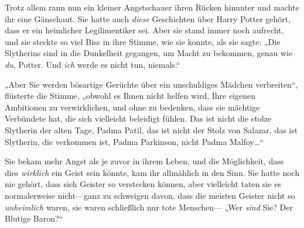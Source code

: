 Trotz allem rann nun ein kleiner Angstschauer ihren Rücken hinunter und machte ihr eine Gänsehaut. Sie hatte auch \emph{diese} Geschichten über Harry Potter gehört, dass er ein heimlicher Legilimentiker sei. Aber sie stand immer noch aufrecht, und sie steckte so viel Biss in ihre Stimme, wie sie konnte, als sie sagte: „Die Slytherins sind in die Dunkelheit gegangen, um Macht zu bekommen, genau wie \emph{du}, Potter. Und \emph{ich} werde es nicht tun, niemals.“

„Aber Sie werden bösartige Gerüchte über ein unschuldiges Mädchen verbreiten“, flüsterte die Stimme, „obwohl es Ihnen nicht helfen wird, Ihre eigenen Ambitionen zu verwirklichen, und ohne zu bedenken, dass sie mächtige Verbündete hat, die sich vielleicht beleidigt fühlen. Das ist nicht die stolze Slytherin der alten Tage, Padma Patil, das ist nicht der Stolz von Salazar, das ist Slytherin, die verkommen ist, Padma Parkinson, nicht Padma Malfoy…“

Sie bekam mehr Angst als je zuvor in ihrem Leben, und die Möglichkeit, dass dies \emph{wirklich} ein Geist sein könnte, kam ihr allmählich in den Sinn. Sie hatte noch nie gehört, dass sich Geister so verstecken können, aber vielleicht taten sie es normalerweise nicht—ganz zu schweigen davon, dass die meisten Geister nicht so \emph{unheimlich} waren, sie waren schließlich nur tote Menschen— „Wer \emph{sind} Sie? Der Blutige Baron?“

